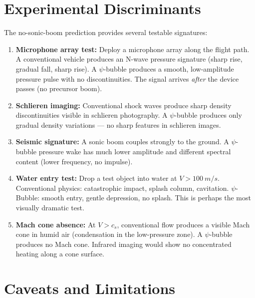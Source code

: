 \documentclass[12pt, letterpaper]{article}
\theoremstyle{definition}
\theoremstyle{remark}
\newcommand{\cs}{c_s}
\begin{document}
\section{Experimental Discriminants}
\label{sec:experiments}

The no-sonic-boom prediction provides several testable signatures:

\begin{enumerate}
\item \textbf{Microphone array test:} Deploy a microphone array along the
flight path. A conventional vehicle produces an N-wave pressure signature
(sharp rise, gradual fall, sharp rise). A $\psi$-bubble produces a smooth,
low-amplitude pressure pulse with no discontinuities. The signal arrives
\emph{after} the device passes (no precursor boom).

\item \textbf{Schlieren imaging:} Conventional shock waves produce sharp density
discontinuities visible in schlieren photography. A $\psi$-bubble produces only
gradual density variations --- no sharp features in schlieren images.

\item \textbf{Seismic signature:} A sonic boom couples strongly to the ground.
A $\psi$-bubble pressure wake has much lower amplitude and different spectral
content (lower frequency, no impulse).

\item \textbf{Water entry test:} Drop a test object into water at
$V > \SI{100}{m/s}$. Conventional physics: catastrophic impact, splash
column, cavitation. $\psi$-Bubble: smooth entry, gentle depression, no splash.
This is perhaps the most visually dramatic test.

\item \textbf{Mach cone absence:} At $V > \cs$, conventional flow produces a
visible Mach cone in humid air (condensation in the low-pressure zone). A
$\psi$-bubble produces no Mach cone. Infrared imaging would show no
concentrated heating along a cone surface.
\end{enumerate}

\section{Caveats and Limitations}
\label{sec:caveats}
\end{document}
